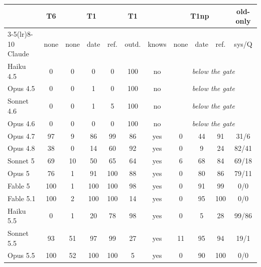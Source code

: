 \begin{tabular}{@{}l c ccc c c ccc c@{}}
\toprule
 & T6 & \multicolumn{3}{c}{T1} & T1 & & \multicolumn{3}{c}{T1np} & old-only \\
\cmidrule(lr){3-5}\cmidrule(lr){8-10}
Claude & none & none & date & ref. & outd. & knows & none & date & ref. & sys/Q \\
\midrule
Haiku 4.5 & 0 & 0 & 0 & 0 & 100 & no & \multicolumn{4}{c}{\textit{below the gate}} \\
Opus 4.5 & 0 & 0 & 1 & 0 & 100 & no & \multicolumn{4}{c}{\textit{below the gate}} \\
Sonnet 4.6 & 0 & 0 & 1 & 5 & 100 & no & \multicolumn{4}{c}{\textit{below the gate}} \\
Opus 4.6 & 0 & 0 & 0 & 0 & 100 & no & \multicolumn{4}{c}{\textit{below the gate}} \\
Opus 4.7 & 97 & 9 & 86 & 99 & 86 & yes & 0 & 44 & 91 & 31/6 \\
Opus 4.8 & 38 & 0 & 14 & 60 & 92 & yes & 0 & 9 & 24 & 82/41 \\
Sonnet 5 & 69 & 10 & 50 & 65 & 64 & yes & 6 & 68 & 84 & 69/18 \\
Opus 5 & 76 & 1 & 91 & 100 & 88 & yes & 0 & 80 & 86 & 79/11 \\
Fable 5 & 100 & 1 & 100 & 100 & 98 & yes & 0 & 91 & 99 & 0/0 \\
Fable 5.1 & 100 & 2 & 100 & 100 & 14 & yes & 0 & 95 & 100 & 0/0 \\
Haiku 5.5 & 0 & 1 & 20 & 78 & 98 & yes & 0 & 5 & 28 & 99/86 \\
Sonnet 5.5 & 93 & 51 & 97 & 99 & 27 & yes & 11 & 95 & 94 & 19/1 \\
Opus 5.5 & 100 & 52 & 100 & 100 & 5 & yes & 0 & 90 & 100 & 0/0 \\
\bottomrule
\end{tabular}
